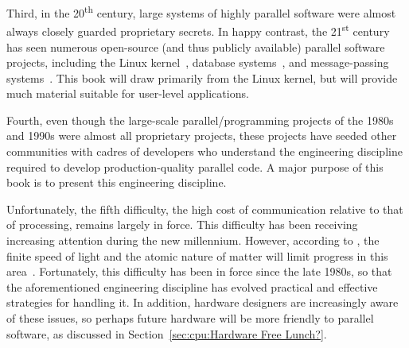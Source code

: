Third, in the 20\textsuperscript{th} century, large systems of
highly parallel software were almost always closely guarded proprietary
secrets.
In happy contrast, the 21\textsuperscript{st} century has seen numerous
open-source (and thus publicly available) parallel software projects,
including the Linux kernel~\cite{Torvalds2.6kernel},
database systems~\cite{PostgreSQL2008,MySQL2008},
and message-passing systems~\cite{OpenMPI2008,BOINC2008}.
This book will draw primarily from the Linux kernel, but will
provide much material suitable for user-level applications.

Fourth, even though the large-scale parallel\-/programming projects of
the 1980s and 1990s were almost all proprietary projects, these
projects have seeded other communities with cadres of developers who
understand the engineering discipline required to develop production-quality
parallel code.
A major purpose of this book is to present this engineering discipline.

Unfortunately, the fifth difficulty, the high cost of communication
relative to that of processing, remains largely in force.
This difficulty has been receiving increasing attention during
the new millennium.
However, according to ,
the finite speed of light and the atomic
nature of matter will limit progress in this
area~\cite{BryanGardiner2007,GordonMoore03a}.
Fortunately, this difficulty has been in force since the late 1980s,
so that the aforementioned engineering discipline has evolved practical
and effective strategies for handling it.
In addition, hardware designers are increasingly aware of these issues,
so perhaps future hardware will be more friendly to parallel software,
as discussed in Section~\ref{sec:cpu:Hardware Free Lunch?}.

